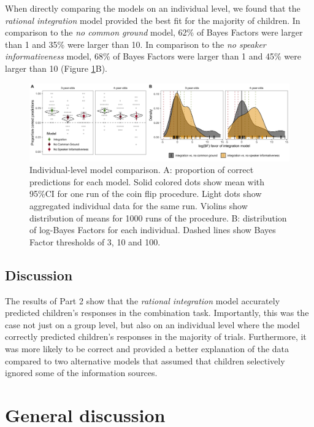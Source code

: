 \documentclass[
  man,mask,floatsintext]{apa6}
\begin{document}
When directly comparing the models on an individual level, we found that the \emph{rational integration} model provided the best fit for the majority of children. In comparison to the \emph{no common ground} model, 62\% of Bayes Factors were larger than 1 and 35\% were larger than 10. In comparison to the \emph{no speaker informativeness} model, 68\% of Bayes Factors were larger than 1 and 45\% were larger than 10 (Figure \ref{fig:fig4}B).

\begin{figure}
\includegraphics[width=1\linewidth]{./figures/fig4} \caption{Individual-level model comparison. A: proportion of correct predictions for each model. Solid colored dots show mean with 95\%CI for one run of the coin flip procedure. Light dots show aggregated individual data for the same run. Violins show distribution of means for 1000 runs of the procedure. B: distribution of log-Bayes Factors for each individual. Dashed lines show Bayes Factor thresholds of 3, 10 and 100.}\label{fig:fig4}
\end{figure}

\hypertarget{discussion-1}{%
\subsection{Discussion}\label{discussion-1}}

The results of Part 2 show that the \emph{rational integration} model accurately predicted children's responses in the combination task. Importantly, this was the case not just on a group level, but also on an individual level where the model correctly predicted children's responses in the majority of trials. Furthermore, it was more likely to be correct and provided a better explanation of the data compared to two alternative models that assumed that children selectively ignored some of the information sources.

\hypertarget{general-discussion}{%
\section{General discussion}\label{general-discussion}}
\end{document}

